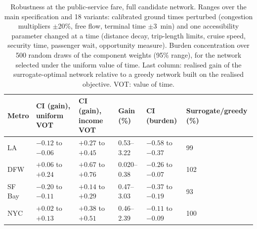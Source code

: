 \begin{table}[!htbp]
\centering
\caption{Robustness at the public-service fare, full candidate network. Ranges over the main specification and 18 variants: calibrated ground times perturbed (congestion multipliers $\pm$20\%, free flow, terminal time $\pm$3~min) and one accessibility parameter changed at a time (distance decay, trip-length limits, cruise speed, security time, passenger wait, opportunity measure). Burden concentration over 500 random draws of the component weights (95\% range), for the network selected under the uniform value of time. Last column: realised gain of the surrogate-optimal network relative to a greedy network built on the realised objective. VOT: value of time.}
\label{tab:robustness}
\footnotesize\setlength{\tabcolsep}{4pt}
\begin{tabular}{llllll}
\toprule
Metro & CI (gain), uniform VOT & CI (gain), income VOT & Gain (\%) & CI (burden) & Surrogate/greedy (\%) \\
\midrule
LA & $-0.12$ to $-0.06$ & $+0.27$ to $+0.45$ & 0.53--3.22 & $-0.58$ to $-0.37$ & 99 \\
DFW & $+0.06$ to $+0.24$ & $+0.67$ to $+0.76$ & 0.020--0.38 & $-0.26$ to $-0.07$ & 102 \\
SF Bay & $-0.20$ to $-0.11$ & $+0.14$ to $+0.29$ & 0.47--3.03 & $-0.37$ to $-0.19$ & 93 \\
NYC & $+0.02$ to $+0.13$ & $+0.38$ to $+0.51$ & 0.46--2.39 & $-0.11$ to $-0.09$ & 100 \\
\bottomrule
\end{tabular}
\end{table}
